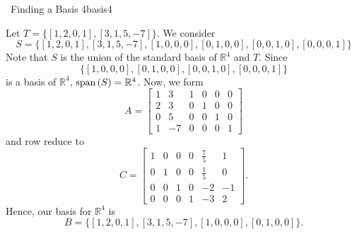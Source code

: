         \begin{example}{\Difficulty\,\Difficulty\,\,Finding a Basis 4}{basis4}

            Let \(T=\{[1,2,0,1],[3,1,5,-7]\}\). We consider 
            \begin{equation*}
                S=\{[1,2,0,1],[3,1,5,-7],[1,0,0,0],[0,1,0,0],[0,0,1,0],[0,0,0,1]\}
            \end{equation*}
            Note that \(S\) is the union of the standard basis of \(\mathbb{R}^4\) and \(T\). Since
            \begin{equation*}
                \{[1,0,0,0],[0,1,0,0],[0,0,1,0],[0,0,0,1]\}
            \end{equation*}
            is a basis of \(\mathbb{R}^4\), \(\text{span\,}(S)=\mathbb{R}^4\). Now, we form
            \begin{equation*}
                A=\begin{bmatrix}
                    1 & 3 & 1 & 0 & 0 & 0 \\
                    2 & 3 & 0 & 1 & 0 & 0 \\
                    0 & 5 & 0 & 0 & 1 & 0 \\
                    1 & -7 & 0 & 0 & 0 & 1
                \end{bmatrix}
            \end{equation*}
            and row reduce to
            \begin{equation*}
                C=\begin{bmatrix}
                    1 & 0 & 0 & 0 & \frac{7}{5} & 1 \\
                    0 & 1 & 0 & 0 & \frac{1}{5} & 0 \\
                    0 & 0 & 1 & 0 & -2 & -1 \\
                    0 & 0 & 0 & 1 & -3 & 2
                \end{bmatrix}.
            \end{equation*}
            Hence, our basis for \(\mathbb{R}^4\) is
            \begin{equation*}
                B=\{[1,2,0,1],[3,1,5,-7],[1,0,0,0],[0,1,0,0]\}.
            \end{equation*}
        \end{example}
        \pagebreak
